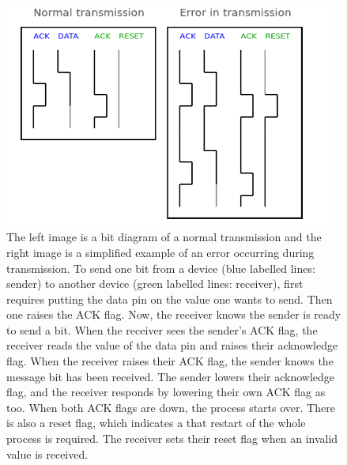 \documentclass[a4paper,10pt]{article} %
\begin{document}
\begin{figure}[H]
\label{fig:handshaking}
\centering
\includegraphics[width=11cm]{img/handshaking.png}
\caption{The left image is a bit diagram of a normal transmission and the right
image is a simplified example of an error occurring during transmission. To send
one bit from a device (blue labelled lines: sender) to another device (green
labelled lines: receiver), first requires putting the data pin on the value one
wants to send. Then one raises the ACK flag. Now, the receiver knows the sender
is ready to send a bit.  When the receiver sees the sender's ACK flag, the
receiver reads the value of the data pin and raises their acknowledge flag. When
the receiver raises their ACK flag, the sender knows the message bit has been
received. The sender lowers their acknowledge flag, and the receiver responds by
lowering their own ACK flag as too. When both ACK flags are down, the process
starts over. There is also a reset flag, which indicates a that restart of the
whole process is required.  The receiver sets their reset flag when an invalid
value is received.}
\end{figure}
\end{document}
